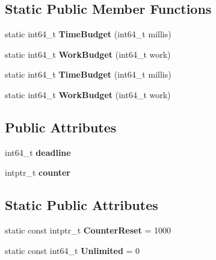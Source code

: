\subsection*{Static Public Member Functions}
\begin{DoxyCompactItemize}
\item 
\hypertarget{structjs_1_1_slice_budget_a86d89d57db280053f4691bf58e007713}{static int64\-\_\-t {\bfseries Time\-Budget} (int64\-\_\-t millis)}\label{structjs_1_1_slice_budget_a86d89d57db280053f4691bf58e007713}

\item 
\hypertarget{structjs_1_1_slice_budget_a8ca046f572d158f8f3d387a802c5ee4c}{static int64\-\_\-t {\bfseries Work\-Budget} (int64\-\_\-t work)}\label{structjs_1_1_slice_budget_a8ca046f572d158f8f3d387a802c5ee4c}

\item 
\hypertarget{structjs_1_1_slice_budget_a86d89d57db280053f4691bf58e007713}{static int64\-\_\-t {\bfseries Time\-Budget} (int64\-\_\-t millis)}\label{structjs_1_1_slice_budget_a86d89d57db280053f4691bf58e007713}

\item 
\hypertarget{structjs_1_1_slice_budget_a8ca046f572d158f8f3d387a802c5ee4c}{static int64\-\_\-t {\bfseries Work\-Budget} (int64\-\_\-t work)}\label{structjs_1_1_slice_budget_a8ca046f572d158f8f3d387a802c5ee4c}

\end{DoxyCompactItemize}
\subsection*{Public Attributes}
\begin{DoxyCompactItemize}
\item 
\hypertarget{structjs_1_1_slice_budget_ae0e95a0128a0de6a5c61f390e9ba8f28}{int64\-\_\-t {\bfseries deadline}}\label{structjs_1_1_slice_budget_ae0e95a0128a0de6a5c61f390e9ba8f28}

\item 
\hypertarget{structjs_1_1_slice_budget_ac01f97f80a4cd94db072653a6ed79204}{intptr\-\_\-t {\bfseries counter}}\label{structjs_1_1_slice_budget_ac01f97f80a4cd94db072653a6ed79204}

\end{DoxyCompactItemize}
\subsection*{Static Public Attributes}
\begin{DoxyCompactItemize}
\item 
\hypertarget{structjs_1_1_slice_budget_a2e15c1d7ea48f50e0c945916671fc1ff}{static const intptr\-\_\-t {\bfseries Counter\-Reset} = 1000}\label{structjs_1_1_slice_budget_a2e15c1d7ea48f50e0c945916671fc1ff}

\item 
\hypertarget{structjs_1_1_slice_budget_a249c08abd340538a518b27a98668ff3a}{static const int64\-\_\-t {\bfseries Unlimited} = 0}\label{structjs_1_1_slice_budget_a249c08abd340538a518b27a98668ff3a}

\end{DoxyCompactItemize}


